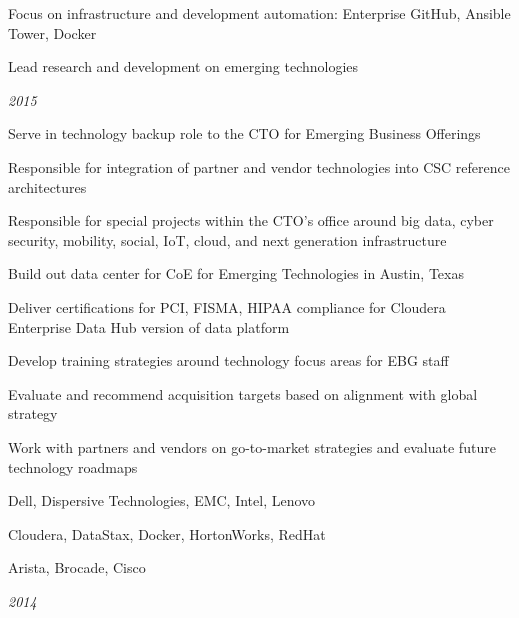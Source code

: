 \begin{itemize}
\begin{itemize*}
                \begin{itemize*}
                  \item Focus on infrastructure and development automation: Enterprise GitHub, Ansible Tower, Docker
                \end{itemize*}
            \item Lead research and development on emerging technologies
        \end{itemize*}
         {\emph{2015}}
        \begin{itemize*}
            \item Serve in technology backup role to the CTO for Emerging Business Offerings
            \item Responsible for integration of partner and vendor technologies into CSC reference architectures
            \item Responsible for special projects within the CTO's office around big data, cyber security, mobility, social, IoT, cloud, and next generation infrastructure
            \begin{itemize*}
              \item Build out data center for CoE for Emerging Technologies in Austin, Texas
              \item Deliver certifications for PCI, FISMA, HIPAA compliance for Cloudera Enterprise Data Hub version of data platform
              \item Develop training strategies around technology focus areas for EBG staff
            \end{itemize*}
            \item Evaluate and recommend acquisition targets based on alignment with global strategy
            \item Work with partners and vendors on go-to-market strategies and evaluate future technology roadmaps
              \begin{itemize*}
                \item Dell, Dispersive Technologies, EMC, Intel, Lenovo
                \item Cloudera, DataStax, Docker, HortonWorks, RedHat
                \item Arista, Brocade, Cisco
              \end{itemize*}
        \end{itemize*}
         {\emph{2014}}

\end{itemize}
